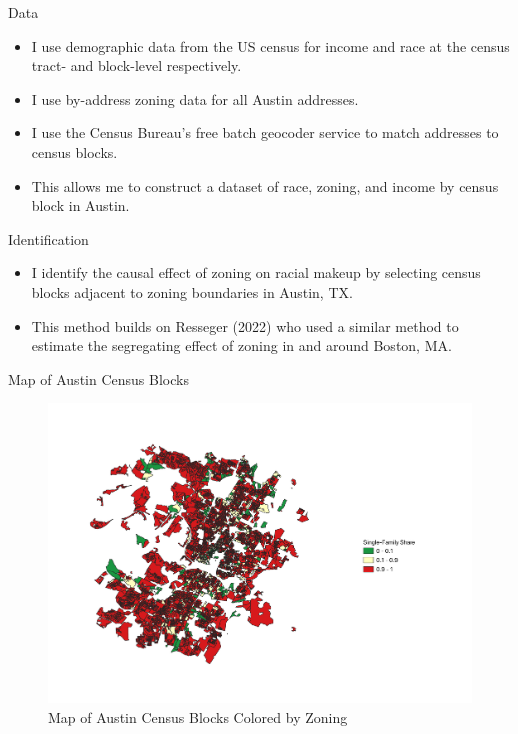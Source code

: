 \documentclass{beamer}
\begin{document}
\begin{frame}{Data}
\begin{itemize}
    \item I use demographic data from the US census for income and race at the census tract- and block-level respectively.
    \item I use by-address zoning data for all Austin addresses.
    \item I use the Census Bureau's free batch geocoder service to match addresses to census blocks.
    \item This allows me to construct a dataset of race, zoning, and income by census block in Austin.
    \end{itemize}
\end{frame}
\begin{frame}{Identification}
    \begin{itemize}
        \item I identify the causal effect of zoning on racial makeup by selecting census blocks adjacent to zoning boundaries in Austin, TX.
        \item This method builds on Resseger (2022) who used a similar method to estimate the segregating effect of zoning in and around Boston, MA.
    \end{itemize}
\end{frame}

\begin{frame}{Map of Austin Census Blocks}
    \begin{figure}
    \centering
    \includegraphics[width=\textwidth]{fig1_redone_output.pdf}
    \caption{Map of Austin Census Blocks Colored by Zoning}
    \label{fig:Austin_Zoning_Map}
\end{figure}
\end{frame}
\end{document}
